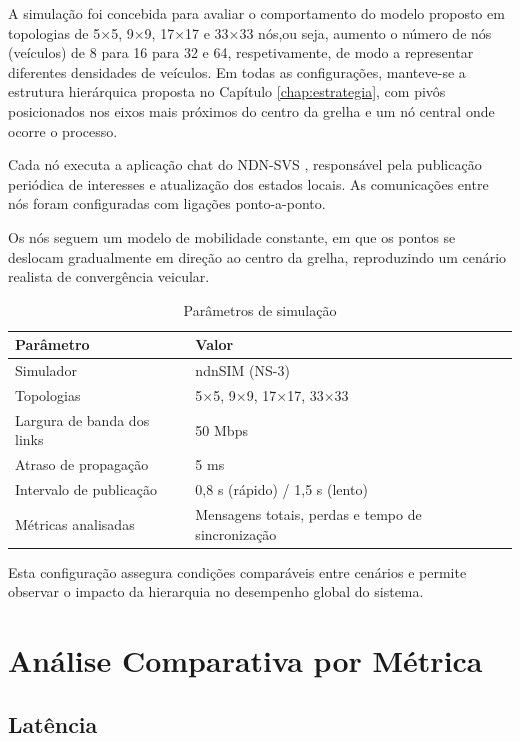 A simulação foi concebida para avaliar o comportamento do modelo proposto em topologias de 5×5, 9×9, 17×17 e 33×33 nós,ou seja, aumento o número de nós (veículos) de 8 para 16 para 32 e 64, respetivamente, de modo a representar diferentes densidades de veículos.  
Em todas as configurações, manteve-se a estrutura hierárquica proposta no Capítulo \ref{chap:estrategia}, com pivôs posicionados nos eixos mais próximos do centro da grelha e um nó central onde ocorre o processo.

Cada nó executa a aplicação chat do NDN-SVS \cite{shsssc_shssscscenario-svs_2023}, responsável pela publicação periódica de interesses e atualização dos estados locais. As comunicações entre nós foram configuradas com ligações ponto-a-ponto.

Os nós seguem um modelo de mobilidade constante, em que os pontos se deslocam gradualmente em direção ao centro da grelha, reproduzindo um cenário realista de convergência veicular.

\begin{table}[h!]
\centering
\caption{Parâmetros de simulação}
\begin{tabular}{ll}
\toprule
\textbf{Parâmetro} & \textbf{Valor} \\ 
\midrule
Simulador & ndnSIM (NS-3) \\
Topologias & 5×5, 9×9, 17×17, 33×33 \\
Largura de banda dos links & 50 Mbps \\
Atraso de propagação & 5 ms \\
Intervalo de publicação & 0,8 s (rápido) / 1,5 s (lento) \\
Métricas analisadas & Mensagens totais, perdas e tempo de sincronização \\ 
\bottomrule
\end{tabular}
\end{table}

Esta configuração assegura condições comparáveis entre cenários e permite observar o impacto da hierarquia no desempenho global do sistema.

\section{Análise Comparativa por Métrica}

\subsection{Latência}

